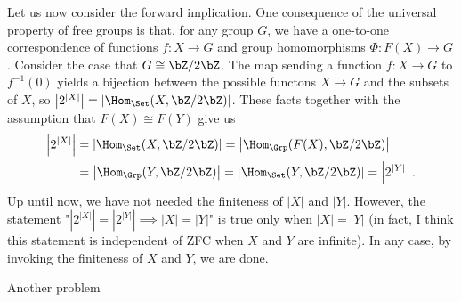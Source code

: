 \begin{homework}[e]
\begin{prf}
		Let us now consider the forward implication. One consequence of the universal property of free groups is that, for any group $G$, we have a one-to-one correspondence of functions $f:X\to G$ and group homomorphisms $\Phi:F(X)\to G$. Consider the case that $G \cong \bZ/2\bZ$. The map sending a function $f:X\to G$ to $f^{-1}(0)$ yields a bijection between the possible functons $X \to G$ and the subsets of $X$, so $\left|2^{|X|}\right| = \left|\Hom_{\Set}(X,\bZ/2\bZ)\right|$. These facts together with the assumption that $F(X) \cong F(Y)$ give us
		\begin{align*}
			\left|2^{|X|}\right| &= \left|\Hom_{\Set}(X,\bZ/2\bZ)\right| = \left|\Hom_{\Grp}(F(X),\bZ/2\bZ)\right| \\
								 &= \left|\Hom_{\Grp}(Y,\bZ/2\bZ)\right| = \left|\Hom_{\Set}(Y,\bZ/2\bZ)\right| = \left|2^{|Y|}\right|.
		\end{align*}
		Up until now, we have not needed the finiteness of $|X|$ and $|Y|$. However, the statement "$\left|2^{|X|}\right| = \left|2^{|Y|}\right| \implies |X| = |Y|$" is true only when $|X| = |Y|$ (in fact, I think this statement is independent of ZFC when $X$ and $Y$ are infinite). In any case, by invoking the finiteness of $X$ and $Y$, we are done.
	\end{prf}

	 Another problem


\end{homework}

